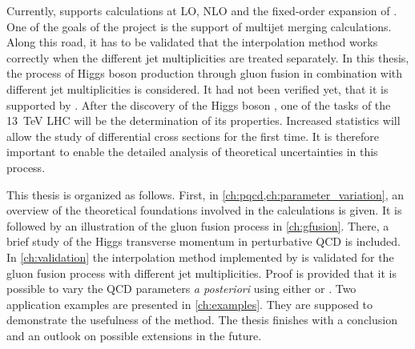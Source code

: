 Currently, \mcgrid{} supports calculations at LO, NLO and the fixed-order expansion of \mcatnlo{}.
One of the goals of the project is the support of multijet merging calculations.
Along this road, it has to be validated that the interpolation method works correctly when the different jet multiplicities are treated separately.
In this thesis, the process of Higgs boson production through gluon fusion in combination with different jet multiplicities is considered.
It had not been verified yet, that it is supported by \mcgrid{}.
After the discovery of the Higgs boson \cite{higgsdiscovery_atlas2012,higgsdiscovery_cms2012}, one of the tasks of the \SI{13}{\tera\electronvolt} LHC will be the determination of its properties.
Increased statistics will allow the study of differential cross sections for the first time.
It is therefore important to enable the detailed analysis of theoretical uncertainties in this process.

This thesis is organized as follows.
First, in \cref{ch:pqcd,ch:parameter_variation}, an overview of the theoretical foundations involved in the calculations is given.
It is followed by an illustration of the gluon fusion process in \cref{ch:gfusion}.
There, a brief study of the Higgs transverse momentum in perturbative QCD is included.
In \cref{ch:validation} the interpolation method implemented by \mcgrid{} is validated for the gluon fusion process with different jet multiplicities.
Proof is provided that it is possible to vary the QCD parameters \textit{a posteriori} using either \appl{} or \fnlo{}.
Two application examples are presented in \cref{ch:examples}.
They are supposed to demonstrate the usefulness of the method.
The thesis finishes with a conclusion and an outlook on possible extensions in the future.

